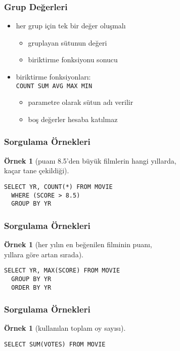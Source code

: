 \documentclass[dvipsnames]{beamer}
\theoremstyle{definition}
\theoremstyle{example}
\newtheorem{ornek}[theorem]{Örnek}
\theoremstyle{plain}
\begin{document}
\begin{frame}[fragile]
  \frametitle{Grup Değerleri}

  \begin{itemize}
    \item her grup için tek bir değer oluşmalı
    \begin{itemize}
      \item gruplayan sütunun değeri
      \item biriktirme fonksiyonu sonucu
    \end{itemize}

    \pause
    \item biriktirme fonksiyonları:\\
      \lstinline!COUNT SUM AVG MAX MIN!
    \begin{itemize}
      \item parametre olarak sütun adı verilir
      \item boş değerler hesaba katılmaz
    \end{itemize}
  \end{itemize}
\end{frame}

\begin{frame}[fragile]
  \frametitle{Sorgulama Örnekleri}

  \begin{ornek}[puanı 8.5'den büyük filmlerin hangi yıllarda,\\
                kaçar tane çekildiği]
    \begin{lstlisting}
SELECT YR, COUNT(*) FROM MOVIE
  WHERE (SCORE > 8.5)
  GROUP BY YR
    \end{lstlisting}
  \end{ornek}
\end{frame}

\begin{frame}[fragile]
  \frametitle{Sorgulama Örnekleri}

  \begin{ornek}[her yılın en beğenilen filminin puanı,\\
                yıllara göre artan sırada]
    \begin{lstlisting}
SELECT YR, MAX(SCORE) FROM MOVIE
  GROUP BY YR
  ORDER BY YR
    \end{lstlisting}
  \end{ornek}
\end{frame}

\begin{frame}[fragile]
  \frametitle{Sorgulama Örnekleri}

  \begin{ornek}[kullanılan toplam oy sayısı]
    \begin{lstlisting}
SELECT SUM(VOTES) FROM MOVIE
    \end{lstlisting}
  \end{ornek}
\end{frame}
\end{document}
